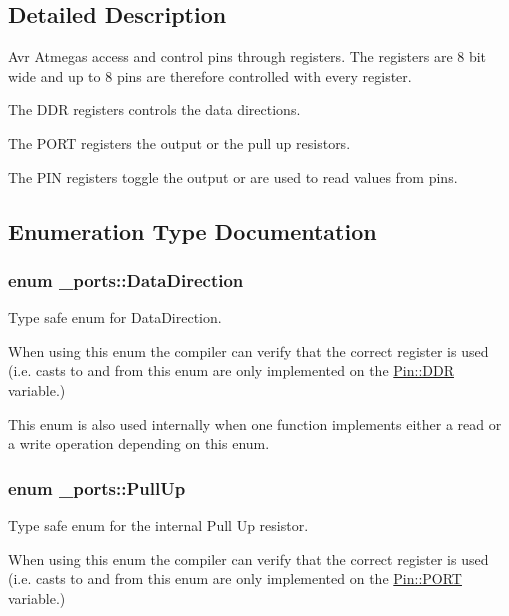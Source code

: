 \subsection{Detailed Description}
Avr Atmegas access and control pins through registers. The registers are 8 bit wide and up to 8 pins are therefore controlled with every register. 


\begin{DoxyItemize}
\item The D\+DR registers controls the data directions.
\item The P\+O\+RT registers the output or the pull up resistors.
\item The P\+IN registers toggle the output or are used to read values from pins. 
\end{DoxyItemize}

\subsection{Enumeration Type Documentation}
\subsubsection[{\texorpdfstring{Data\+Direction}{DataDirection}}]{\setlength{\rightskip}{0pt plus 5cm}enum {\bf \+\_\+ports\+::\+Data\+Direction}\hspace{0.3cm}{\ttfamily [strong]}}\hypertarget{namespace__ports_a20e5153351b42b5fd86473fa045c98ea}{}\label{namespace__ports_a20e5153351b42b5fd86473fa045c98ea}


Type safe enum for Data\+Direction. 

When using this enum the compiler can verify that the correct register is used (i.\+e. casts to and from this enum are only implemented on the \hyperlink{struct__ports_1_1Pin_a98b2b6c1bbac0b66435fa91223add866}{Pin\+::\+D\+DR} variable.)

This enum is also used internally when one function implements either a read or a write operation depending on this enum. 
\subsubsection[{\texorpdfstring{Pull\+Up}{PullUp}}]{\setlength{\rightskip}{0pt plus 5cm}enum {\bf \+\_\+ports\+::\+Pull\+Up}\hspace{0.3cm}{\ttfamily [strong]}}\hypertarget{namespace__ports_a39c7c69d8e84949d7f7680e5b25a3742}{}\label{namespace__ports_a39c7c69d8e84949d7f7680e5b25a3742}


Type safe enum for the internal Pull Up resistor. 

When using this enum the compiler can verify that the correct register is used (i.\+e. casts to and from this enum are only implemented on the \hyperlink{struct__ports_1_1Pin_a7ae4c8a631070ea0652b8ea59416bc37}{Pin\+::\+P\+O\+RT} variable.) 